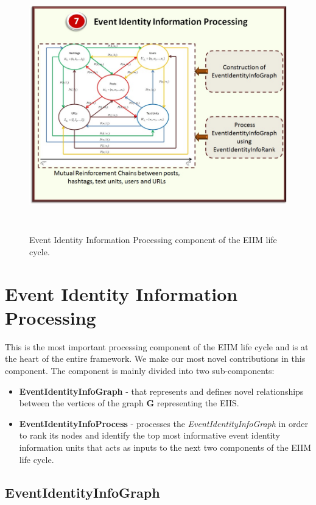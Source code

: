 \begin{figure}[htbp]
  \caption{Event Identity Information Processing component of the EIIM life cycle.}
  \centering
    \includegraphics[width=14cm,height=11cm]{Figures/EIIMComponents/EventIdentityInformationProcessing.jpg}
\end{figure}

\section{Event Identity Information Processing\label{EventIdentityInformationProcessing}}
This is the most important processing component of the EIIM life cycle and is at the heart of the entire framework. We make our most novel contributions in this component. The component is mainly divided into two sub-components:
\begin{itemize}
\item \textbf{EventIdentityInfoGraph} - that represents and defines novel relationships between the vertices of the graph $\mathbf{G}$ representing the EIIS.
\item \textbf{EventIdentityInfoProcess} - processes the \textit{EventIdentityInfoGraph} in order to rank its nodes and identify the top most informative event identity information units that acts as inputs to the next two components of the EIIM life cycle.
\end{itemize}

\subsection{EventIdentityInfoGraph\label{eventidentityinfograph}}

